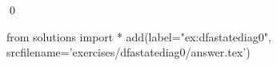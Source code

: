 
\begin{ex} 
  \label{ex:dfastatediag0}
  
  \qed
\end{ex} 
\begin{python0}
from solutions import *
add(label="ex:dfastatediag0",
    srcfilename='exercises/dfastatediag0/answer.tex') 
\end{python0}
